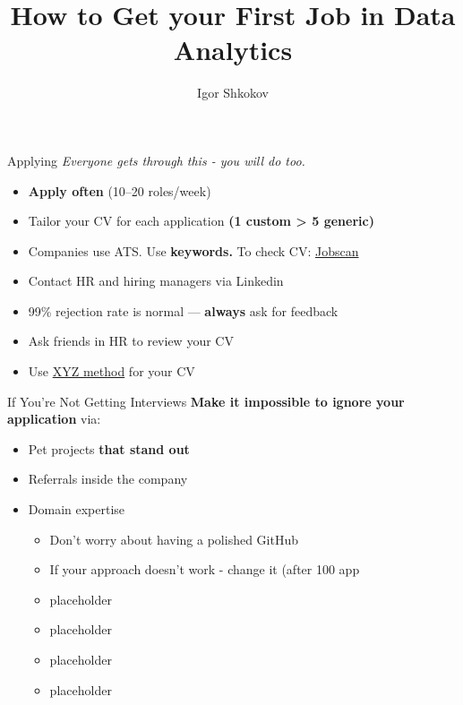 \documentclass[10pt,a4paper]{article}
\date{} %
\title{How to Get your First Job in \textbf{Data Analytics}}
\author{Igor Shkokov}
\begin{document}
\small
\begin{multicols}{3}

\maketitle
\thispagestyle{empty}
\scriptsize

\begin{textbox}{Applying}
\emph{Everyone gets through this - you will do too.}
\begin{itemize}
    \item \textbf{Apply often} (10--20 roles/week)
    \item Tailor your CV for each application \textbf{(1 custom > 5 generic)}
    \item Companies use ATS. Use \textbf{keywords.} To check CV: \href{https://www.jobscan.co/}{Jobscan}
    \item Contact HR and hiring managers via Linkedin
    \item 99\% rejection rate is normal --- \textbf{always} ask for feedback
    \item Ask friends in HR to review your CV
    \item Use \href{https://www.tealhq.com/post/xyz-resume}{XYZ method} for your CV
\end{itemize}
\end{textbox}

\begin{textboxGray}{If You're Not Getting Interviews}
\textbf{Make it impossible to ignore your application} via:
\begin{itemize}
    \item Pet projects \textbf{that stand out}
    \item Referrals inside the company
    \item Domain expertise
	\begin{itemize}
    \item Don't worry about having a polished GitHub
    \item If your approach doesn’t work - change it (after 100 app
    \item placeholder
    \item placeholder
    \item placeholder
    \item placeholder
	\end{itemize}
\end{itemize}
\end{textboxGray}


\end{multicols}
\end{document}

